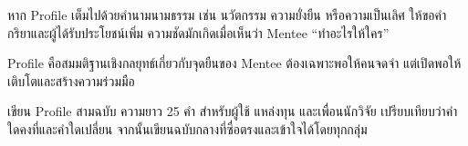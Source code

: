 
\begin{mentornote}
หาก Profile เต็มไปด้วยคำนามนามธรรม เช่น นวัตกรรม ความยั่งยืน หรือความเป็นเลิศ ให้ขอคำกริยาและผู้ได้รับประโยชน์เพิ่ม ความชัดมักเกิดเมื่อเห็นว่า Mentee \enquote{ทำอะไรให้ใคร}
\end{mentornote}

\begin{keytakeaway}
Profile คือสมมติฐานเชิงกลยุทธ์เกี่ยวกับจุดยืนของ Mentee ต้องเฉพาะพอให้คนจดจำ แต่เปิดพอให้เติบโตและสร้างความร่วมมือ
\end{keytakeaway}

\begin{reflection}
เขียน Profile สามฉบับ ความยาว 25 คำ สำหรับผู้ใช้ แหล่งทุน และเพื่อนนักวิจัย เปรียบเทียบว่าคำใดคงที่และคำใดเปลี่ยน จากนั้นเขียนฉบับกลางที่ซื่อตรงและเข้าใจได้โดยทุกกลุ่ม
\blankline\blankline
\end{reflection}

